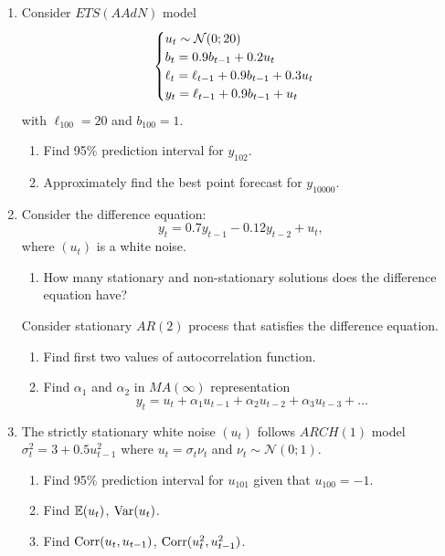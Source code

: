 \begin{enumerate}

    \item Consider $ETS(AAdN)$ model 
    \[
    \begin{cases}
    u_t  \sim \mathcal{N}(0;20) \\
    b_t = 0.9 b_{t-1} + 0.2 u_t \\
    \ell_t = \ell_{t-1} + 0.9 b_{t-1} + 0.3 u_t \\
    y_t = \ell_{t-1} + 0.9 b_{t-1} + u_t \\
    \end{cases}
    \]
    with $\ell_{100} = 20$ and $b_{100} = 1$.
    \begin{enumerate}
        \item Find 95\% prediction interval for $y_{102}$.
        \item Approximately find the best point forecast for $y_{10000}$.
    \end{enumerate}
    
    \item Consider the difference equation:
    \[
    y_t = 0.7y_{t-1} - 0.12 y_{t-2} + u_t,    
    \]
    where $(u_t)$ is a white noise. 
    \begin{enumerate}
        \item How many stationary and non-stationary solutions does the difference equation have?
    \end{enumerate}
    
    Consider stationary $AR(2)$ process that satisfies the difference equation. 
    
    \begin{enumerate}[resume]
        \item Find first two values of autocorrelation function.
        \item Find $\alpha_1$ and $\alpha_2$ in $MA(\infty)$ representation 
    \[
    y_t = u_t + \alpha_1 u_{t-1} + \alpha_2 u_{t-2} + \alpha_3 u_{t-3} + \ldots
    \]
    \end{enumerate}
    
    
    \item The strictly stationary white noise $(u_t)$ follows $ARCH(1)$ model $\sigma^2_t = 3 + 0.5 u_{t-1}^2$ where 
    $u_t = \sigma_t \nu_t$ and $\nu_t \sim \mathcal{N}(0;1)$.
    \begin{enumerate}
        \item Find 95\% prediction interval for $u_{101}$ given that $u_{100} = -1$.
        \item Find $\operatorname{\mathbb{E}}(u_t)$, $\operatorname{Var}(u_t)$.
        \item Find $\operatorname{Corr}(u_t, u_{t-1})$, $\operatorname{Corr}(u_t^2, u_{t-1}^2)$.
    \end{enumerate}
    

\end{enumerate}
